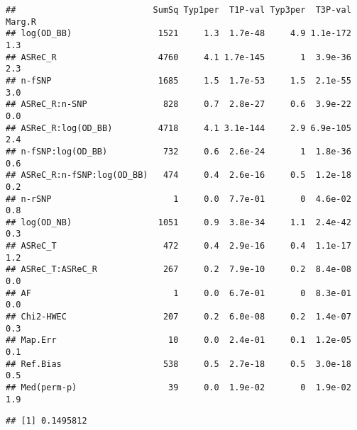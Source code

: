 \documentclass[]{article}
\newenvironment{Shaded}{\begin{snugshade}}{\end{snugshade}}
\newcommand{\KeywordTok}[1]{\textcolor[rgb]{0.13,0.29,0.53}{\textbf{#1}}}
\newcommand{\DataTypeTok}[1]{\textcolor[rgb]{0.13,0.29,0.53}{#1}}
\newcommand{\StringTok}[1]{\textcolor[rgb]{0.31,0.60,0.02}{#1}}
\newcommand{\OperatorTok}[1]{\textcolor[rgb]{0.81,0.36,0.00}{\textbf{#1}}}
\newcommand{\NormalTok}[1]{#1}
\begin{document}
\begin{Shaded}
\end{Shaded}

\begin{verbatim}
##                           SumSq Typ1per  T1P-val Typ3per  T3P-val Marg.R
## log(OD_BB)                 1521     1.3  1.7e-48     4.9 1.1e-172    1.3
## ASReC_R                    4760     4.1 1.7e-145       1  3.9e-36    2.3
## n-fSNP                     1685     1.5  1.7e-53     1.5  2.1e-55    3.0
## ASReC_R:n-SNP               828     0.7  2.8e-27     0.6  3.9e-22    0.0
## ASReC_R:log(OD_BB)         4718     4.1 3.1e-144     2.9 6.9e-105    2.4
## n-fSNP:log(OD_BB)           732     0.6  2.6e-24       1  1.8e-36    0.6
## ASReC_R:n-fSNP:log(OD_BB)   474     0.4  2.6e-16     0.5  1.2e-18    0.2
## n-rSNP                        1     0.0  7.7e-01       0  4.6e-02    0.8
## log(OD_NB)                 1051     0.9  3.8e-34     1.1  2.4e-42    0.3
## ASReC_T                     472     0.4  2.9e-16     0.4  1.1e-17    1.2
## ASReC_T:ASReC_R             267     0.2  7.9e-10     0.2  8.4e-08    0.0
## AF                            1     0.0  6.7e-01       0  8.3e-01    0.0
## Chi2-HWEC                   207     0.2  6.0e-08     0.2  1.4e-07    0.3
## Map.Err                      10     0.0  2.4e-01     0.1  1.2e-05    0.1
## Ref.Bias                    538     0.5  2.7e-18     0.5  3.0e-18    0.5
## Med(perm-p)                  39     0.0  1.9e-02       0  1.9e-02    1.9
\end{verbatim}

\begin{Shaded}
\end{Shaded}

\begin{verbatim}
## [1] 0.1495812
\end{verbatim}

\begin{Shaded}
\end{Shaded}
\end{document}
